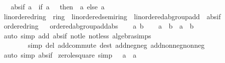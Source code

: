 \begin{isabellebody}
\ \ \ abs{\isacharunderscore}{\kern0pt}if{\isacharcolon}{\kern0pt}\ {\isachardoublequoteopen}{\isasymbar}a{\isasymbar}\ {\isacharequal}{\kern0pt}\ {\isacharparenleft}{\kern0pt}if\ a\ {\isacharless}{\kern0pt}\ {}\ then\ {\isacharminus}{\kern0pt}\ a\ else\ a{\isacharparenright}{\kern0pt}{\isachardoublequoteclose}\isanewline
\isanewline
{}\isamarkupfalse%
\ linordered{\isacharunderscore}{\kern0pt}ring\ {\isacharequal}{\kern0pt}\ ring\ {\isacharplus}{\kern0pt}\ linordered{\isacharunderscore}{\kern0pt}semiring\ {\isacharplus}{\kern0pt}\ linordered{\isacharunderscore}{\kern0pt}ab{\isacharunderscore}{\kern0pt}group{\isacharunderscore}{\kern0pt}add\ {\isacharplus}{\kern0pt}\ abs{\isacharunderscore}{\kern0pt}if\isanewline
{}\isanewline
\isanewline
{}\isamarkupfalse%
\ ordered{\isacharunderscore}{\kern0pt}ring%
\isadelimproof
\ %
\endisadelimproof
%
\isatagproof
\isacommand{{\isachardot}{\kern0pt}{\isachardot}{\kern0pt}}\isamarkupfalse%
%
\endisatagproof
{\isafoldproof}%
%
\isadelimproof
%
\endisadelimproof
\isanewline
\isanewline
{}\isamarkupfalse%
\ ordered{\isacharunderscore}{\kern0pt}ab{\isacharunderscore}{\kern0pt}group{\isacharunderscore}{\kern0pt}add{\isacharunderscore}{\kern0pt}abs\isanewline
%
\isadelimproof
%
\endisadelimproof
%
\isatagproof
{}\isamarkupfalse%
\isanewline
\ \ \isamarkupfalse%
\ a\ b\isanewline
\ \ \isamarkupfalse%
\ {\isachardoublequoteopen}{\isasymbar}a\ {\isacharplus}{\kern0pt}\ b{\isasymbar}\ {\isasymle}\ {\isasymbar}a{\isasymbar}\ {\isacharplus}{\kern0pt}\ {\isasymbar}b{\isasymbar}{\isachardoublequoteclose}\isanewline
\ \ \ \ \isamarkupfalse%
\ {\isacharparenleft}{\kern0pt}auto\ simp\ add{\isacharcolon}{\kern0pt}\ abs{\isacharunderscore}{\kern0pt}if\ not{\isacharunderscore}{\kern0pt}le\ not{\isacharunderscore}{\kern0pt}less\ algebra{\isacharunderscore}{\kern0pt}simps\isanewline
\ \ \ \ \ \ \ \ simp\ del{\isacharcolon}{\kern0pt}\ add{\isachardot}{\kern0pt}commute\ dest{\isacharcolon}{\kern0pt}\ add{\isacharunderscore}{\kern0pt}neg{\isacharunderscore}{\kern0pt}neg\ add{\isacharunderscore}{\kern0pt}nonneg{\isacharunderscore}{\kern0pt}nonneg{\isacharparenright}{\kern0pt}\isanewline
{}\isamarkupfalse%
\ {\isacharparenleft}{\kern0pt}auto\ simp{\isacharcolon}{\kern0pt}\ abs{\isacharunderscore}{\kern0pt}if{\isacharparenright}{\kern0pt}%
\endisatagproof
{\isafoldproof}%
%
\isadelimproof
\isanewline
%
\endisadelimproof
\isanewline
{}\isamarkupfalse%
\ zero{\isacharunderscore}{\kern0pt}le{\isacharunderscore}{\kern0pt}square\ {\isacharbrackleft}{\kern0pt}simp{\isacharbrackright}{\kern0pt}{\isacharcolon}{\kern0pt}\ {\isachardoublequoteopen}{}\ {\isasymle}\ a\ {\isacharasterisk}{\kern0pt}\ a{\isachardoublequoteclose}\isanewline

\end{isabellebody}
